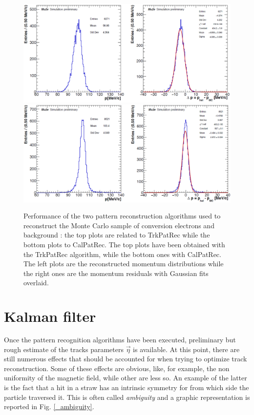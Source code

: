 \documentclass[12pt,a4paper,openright, oneside, titlepage]{book} %
\begin{document}
\begin{figure}[h!]
\centering
\includegraphics[scale=0.6]{giani_TrkPatRec_performance}
\includegraphics[scale=0.6]{giani_CalPatRec_performance}
\caption{Performance of the two pattern reconstruction algorithms used to reconstruct 
the Monte Carlo sample of conversion electrons and background \cite{GianiPatRec:2020}: 
the top plots are related to TrkPatRec while the bottom plots to CalPatRec. 
The top plots have been obtained with the TrkPatRec algorithm,
while the bottom ones with CalPatRec. 
The left plots are the reconstructed momentum distributions 
while the right ones are the momentum residuals
with Gaussian fits overlaid.}
\label{_PatRec_performance}
\end{figure}

\section{Kalman filter}
Once the pattern recognition algorithms have been executed, 
preliminary but rough estimate of the tracks parameters $\vec{\eta}$ is available. 
At this point, there are still numerous effects that should be accounted for 
when trying to optimize track reconstruction. 
Some of these effects are obvious, 
like, for example, the non uniformity of the magnetic field, 
while other are less so. 
An example of the latter is the fact that a hit in a straw has 
an intrinsic symmetry for from which side the particle traversed it. 
This is often called \textit{ambiguity} and a graphic representation is reported in Fig. \ref{_ambiguity}.\\
\end{document}
